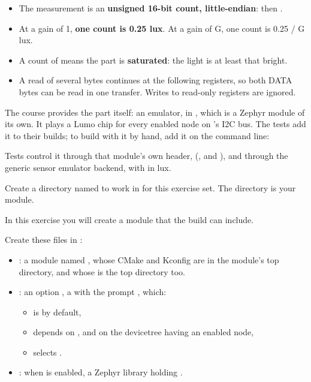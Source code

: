 \begin{itemize}
  \item The measurement is an \textbf{unsigned 16-bit count, little-endian}:  then
    .
  \item At a gain of 1, \textbf{one count is 0.25 lux}. At a gain of G, one count is 0.25 / G lux.
  \item A count of  means the part is \textbf{saturated}: the light is at least that bright.
  \item A read of several bytes continues at the following registers, so both DATA bytes can be read in one
    transfer. Writes to read-only registers are ignored.
\end{itemize}

The course provides the part itself: an emulator, in ,
which is a Zephyr module of its own. It plays a Lumo chip for every enabled 
node on ’s I2C bus. The tests add it to their builds; to build with it by hand, add
it on the command line:


\noindent Tests control it through that module's own header, 
(,  and ),
and through the generic sensor emulator backend, with  in lux.

\label{c5:set:1}
Create a directory named  to work in for this exercise set. The directory is your
module.

\label{c5:ex:1.1}
In this exercise you will create a module that the build can include.

Create these files in :

\begin{itemize}
  \item {}: a module named , whose CMake and Kconfig are in the
    module’s top directory, and whose  is the top directory too.
  \item {}: an option , a  with the prompt , which:
\begin{itemize}
  \item is  by default,
  \item depends on , and on the devicetree having an enabled  node,
  \item selects .
\end{itemize}
  \item {}: when  is enabled, a Zephyr library holding
    .
\end{itemize}

